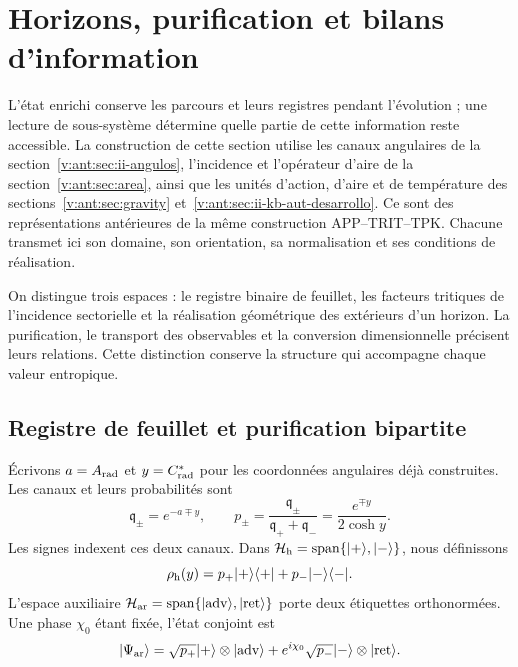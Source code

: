 
\section{Horizons, purification et bilans d'information}
\label{vii:sec:horizontes-informacion}

L'état enrichi conserve les parcours et leurs registres pendant l'évolution ; une lecture de sous-système détermine quelle partie de cette information reste accessible. La construction de cette section utilise les canaux angulaires de la section~\ref{v:ant:sec:ii-angulos}, l'incidence et l'opérateur d'aire de la section~\ref{v:ant:sec:area}, ainsi que les unités d'action, d'aire et de température des sections~\ref{v:ant:sec:gravity} et~\ref{v:ant:sec:ii-kb-aut-desarrollo}. Ce sont des représentations antérieures de la même construction APP--TRIT--TPK. Chacune transmet ici son domaine, son orientation, sa normalisation et ses conditions de réalisation.

On distingue trois espaces : le registre binaire de feuillet, les facteurs
tritiques de l'incidence sectorielle et la réalisation géométrique des
extérieurs d'un horizon. La purification, le transport des observables
et la conversion dimensionnelle précisent leurs relations. Cette
distinction conserve la structure qui accompagne chaque valeur entropique.

\subsection{Registre de feuillet et purification bipartite}
\label{vii:subsec:hojas-purificacion}

Écrivons \(a=A_{\rm rad}\) et \(y=C^*_{\rm rad}\) pour les
coordonnées angulaires déjà construites. Les canaux et leurs probabilités sont
\begin{equation}
 \mathfrak q_\pm=e^{-a\mp y},\qquad
 p_\pm=\frac{\mathfrak q_\pm}{\mathfrak q_++\mathfrak q_-}
       =\frac{e^{\mp y}}{2\cosh y}.
 \label{vii:eq:probabilidades-hoja}
\end{equation}
Les signes indexent ces deux canaux. Dans
\(\mathcal H_{\rm h}=\operatorname{span}\{|+\rangle,|-\rangle\}\),
nous définissons
\[
 \rho_{\rm h}(y)=p_+|+\rangle\langle+|+p_-|-\rangle\langle-|.
\]
L'espace auxiliaire \(\mathcal H_{\rm ar}=\operatorname{span}
\{|\mathrm{adv}\rangle,|\mathrm{ret}\rangle\}\) porte deux étiquettes orthonormées. Une phase \(\chi_0\) étant fixée, l'état conjoint est
\begin{equation}
 |\Psi_{\rm ar}\rangle
 =\sqrt{p_+}|+\rangle\otimes|\mathrm{adv}\rangle
  +e^{i\chi_0}\sqrt{p_-}|-\rangle\otimes|\mathrm{ret}\rangle.
 \label{vii:eq:purificacion-hoja}
\end{equation}

